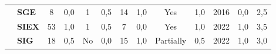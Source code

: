 \begin{table}[!htb]
\begin{tabular}{c|p{2cm}|cc|cc|cc|cc|cc|c}
    {\cellcolor[rgb]{0.753,0.753,0.753}}                                            & {\cellcolor[rgb]{0.753,0.753,0.753}}\textbf{SGE}                                                   & 8                                                                         & 0,0                                                                       & 1                                                                         & 0,5                                                                      & 14                                                       & 1,0                                               & Yes                                                & 1,0                                               & 2016                                               & 0,0                                                                                                                                                 & 2,5 \\
    \rowcolor[rgb]{0.898,0.898,0.898} {\cellcolor[rgb]{0.753,0.753,0.753}}          & {\cellcolor[rgb]{0.753,0.753,0.753}}\textbf{SIEX}                                                  & 53                                                                        & 1,0                                                                       & 1                                                                         & 0,5                                                                      & 7                                                        & 0,0                                               & Yes                                                & 1,0                                               & 2022                                               & 1,0                                                                                                                                                 & 3,5 \\
    {\cellcolor[rgb]{0.753,0.753,0.753}}                                            & {\cellcolor[rgb]{0.753,0.753,0.753}}\textbf{SIG}                                                   & 18                                                                        & 0,5                                                                       & No                                                                        & 0,0                                                                      & 15                                                       & 1,0                                               & Partially                                          & 0,5                                               & 2022                                               & 1,0                                                                                                                                                 & 3,0 \\

\end{tabular}
\end{table}
